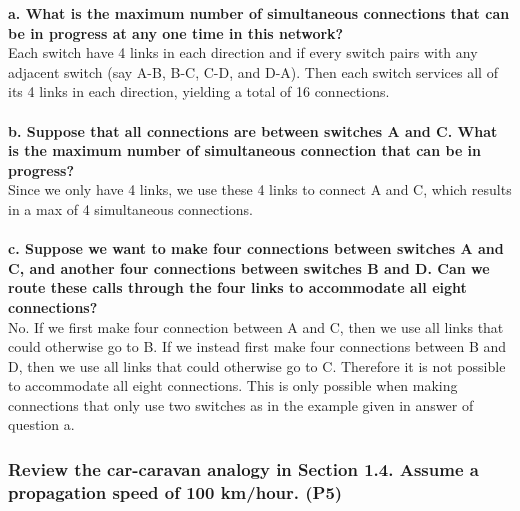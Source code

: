\textbf{a. What is the maximum number of simultaneous connections that can be in progress at any one time in this network?}\\
Each switch have 4 links in each direction and if every switch pairs with any adjacent switch (say A-B, B-C, C-D, and D-A). Then each switch services all of its 4 links in each direction, yielding a total of 16 connections. \\
\\
\textbf{b. Suppose that all connections are between switches A and C. What is the maximum number of simultaneous connection that can be in progress?}\\
Since we only have 4 links, we use these 4 links to connect A and C, which results in a max of 4 simultaneous connections. \\
\\
\textbf{c. Suppose we want to make four connections between switches A and C, and another four connections between switches B and D. Can we route these calls through the four links to accommodate all eight connections?}\\
No. If we first make four connection between A and C, then we use all links that could otherwise go to B. If we instead first make four connections between B and D, then we use all links that could otherwise go to C. Therefore it is not possible to accommodate all eight connections. This is only possible when making connections that only use two switches as in the example given in answer of question a. 



\subsubsection{Review the car-caravan analogy in Section 1.4. Assume a propagation speed of 100 km/hour. (P5)}

